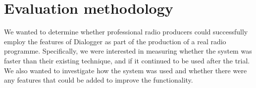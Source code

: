 






\section{Evaluation methodology}\label{sec:methods}
We wanted to determine whether professional radio producers could successfully employ the features of Dialogger
as part of the production of a real radio programme. Specifically, we were interested in measuring
whether the system was faster than their existing technique, and if it continued to be used after the trial.  We also
wanted to investigate how the system was used and whether there were any features that could be added to improve the
functionality.

